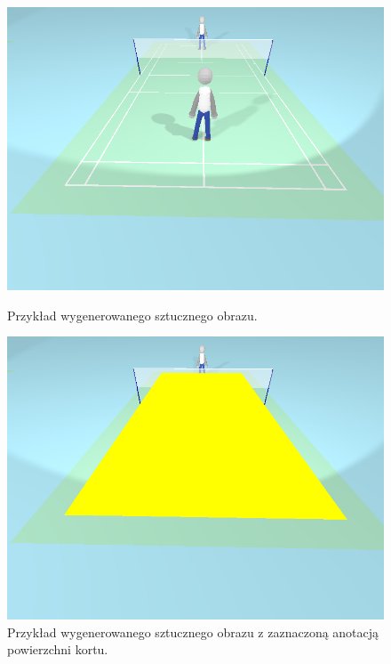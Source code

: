 \begin{figure}[!htb]
    \includegraphics[width=\linewidth]{./fake.jpg}
    \caption{Przykład wygenerowanego sztucznego obrazu.}
  \endminipage\hfill
    \includegraphics[width=\linewidth]{./fake_annotated.jpg}
    \caption{Przykład wygenerowanego sztucznego obrazu z zaznaczoną anotacją powierzchni kortu.}
    \label{fig:annotated_fake}
  \endminipage\hfill
\end{figure}
